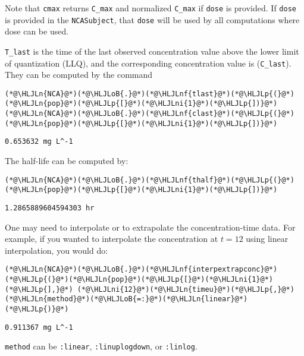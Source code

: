 \documentclass[12pt,a4paper]{article}
\newcommand{\HLJLn}[1]{#1}
\newcommand{\HLJLnf}[1]{\textcolor[RGB]{66,102,213}{#1}}
\newcommand{\HLJLni}[1]{\textcolor[RGB]{59,151,46}{#1}}
\newcommand{\HLJLoB}[1]{\textcolor[RGB]{102,102,102}{\textbf{#1}}}
\newcommand{\HLJLp}[1]{#1}
\begin{document}
Note that \texttt{cmax} returns \texttt{C\_max} and normalized \texttt{C\_max} if \texttt{dose} is provided. If \texttt{dose} is provided in the \texttt{NCASubject}, that \texttt{dose} will be used by all computations where dose can be used.

\texttt{T\_last} is the time of the last observed concentration value above the lower limit of quantization (LLQ), and the corresponding concentration value is (\texttt{C\_last}). They can be computed by the command


\begin{lstlisting}
(*@\HLJLn{NCA}@*)(*@\HLJLoB{.}@*)(*@\HLJLnf{tlast}@*)(*@\HLJLp{(}@*)(*@\HLJLn{pop}@*)(*@\HLJLp{[}@*)(*@\HLJLni{1}@*)(*@\HLJLp{])}@*)
(*@\HLJLn{NCA}@*)(*@\HLJLoB{.}@*)(*@\HLJLnf{clast}@*)(*@\HLJLp{(}@*)(*@\HLJLn{pop}@*)(*@\HLJLp{[}@*)(*@\HLJLni{1}@*)(*@\HLJLp{])}@*)
\end{lstlisting}

\begin{lstlisting}
0.653632 mg L^-1
\end{lstlisting}


The half-life can be computed by:


\begin{lstlisting}
(*@\HLJLn{NCA}@*)(*@\HLJLoB{.}@*)(*@\HLJLnf{thalf}@*)(*@\HLJLp{(}@*)(*@\HLJLn{pop}@*)(*@\HLJLp{[}@*)(*@\HLJLni{1}@*)(*@\HLJLp{])}@*)
\end{lstlisting}

\begin{lstlisting}
1.2865889604594303 hr
\end{lstlisting}


One may need to interpolate or to extrapolate the concentration-time data. For example, if you wanted to interpolate the concentration at $t=12$ using linear interpolation, you would do:


\begin{lstlisting}
(*@\HLJLn{NCA}@*)(*@\HLJLoB{.}@*)(*@\HLJLnf{interpextrapconc}@*)(*@\HLJLp{(}@*)(*@\HLJLn{pop}@*)(*@\HLJLp{[}@*)(*@\HLJLni{1}@*)(*@\HLJLp{],}@*) (*@\HLJLni{12}@*)(*@\HLJLn{timeu}@*)(*@\HLJLp{,}@*) (*@\HLJLn{method}@*)(*@\HLJLoB{=:}@*)(*@\HLJLn{linear}@*)(*@\HLJLp{)}@*)
\end{lstlisting}

\begin{lstlisting}
0.911367 mg L^-1
\end{lstlisting}


\texttt{method} can be \texttt{:linear}, \texttt{:linuplogdown}, or \texttt{:linlog}.
\end{document}
